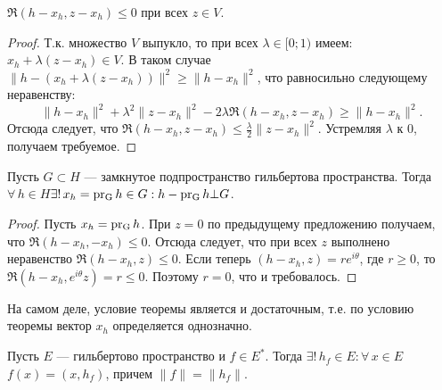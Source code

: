 \documentclass[10pt,titlepage, a4paper]{article}
\begin{document}
\begin{predl}
$\Re(h-x_h,z-x_h)\leqslant 0$ при всех $z\in V$.
\end{predl}

\begin{proof}
Т.к. множество $V$ выпукло, то при всех $\lambda\in[0;1)$ имеем:
$x_h+\lambda(z-x_h)\in V$. В таком случае
$\|h-(x_h+\lambda(z-x_h))\|^2\geqslant\|h-x_h\|^2$, что равносильно
следующему неравенству:
$$\|h-x_h\|^2+\lambda^2\|z-x_h\|^2-2\lambda\Re(h-x_h,z-x_h)\geqslant \|h-x_h\|^2.$$
Отсюда следует, что $\Re(h-x_h,z-x_h)\leqslant\frac\lambda 2
\|z-x_h\|^2$. Устремляя $\lambda $ к 0, получаем требуемое.
\end{proof}

\begin{theorem}
Пусть $G\subset H$ --- замкнутое подпространство гильбертова
пространства. Тогда $\forall\,h\in H$\;\;$\exists!\,x_h=\mathop{\mathrm{pr_{G}}}h\in
G:h-\mathop{\mathrm{pr_{G}}}h\bot G$.
\end{theorem}

\begin{proof}
Пусть $x_h=\mathop{\mathrm{pr_{G}}}h$. При $z=0$ по предыдущему предложению получаем,
что $\Re (h-x_h,-x_h)\leqslant 0$. Отсюда следует, что при всех $z$
выполнено неравенство $\Re(h-x_h,z)\leqslant 0$. Если теперь
$(h-x_h,z)=re^{i\theta}$, где $r\geqslant0$, то
$\Re(h-x_h,e^{i\theta}z)=r\leqslant0$. Поэтому $r=0$, что и
требовалось.
\end{proof}

\begin{zam}
На самом деле, условие теоремы является и достаточным, т.е. по
условию теоремы вектор $x_h$ определяется однозначно.
\end{zam}

\begin{theorem}[Рисс]
Пусть $E$ --- гильбертово пространство и $f\in E^*$. Тогда
$\exists!\,h_f\in E:\forall\,x\in E$\;\;$f(x)=(x,h_f)$, причем
$\|f\|=\|h_f\|$.
\end{theorem}
\end{document}
